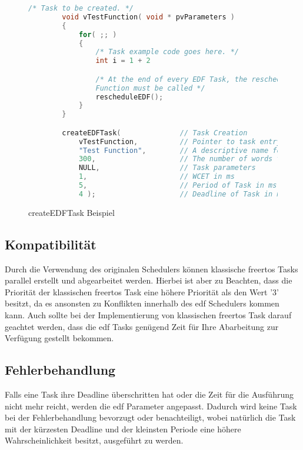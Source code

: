 \documentclass[../EDF Master Thesis.tex]{subfiles}
\begin{document}
    \begin{figure}[ht!]
        \begin{lstlisting}[language=C, caption=FreeRTOS Task creation and deletion, label=code:freertos_task_creation]
        /* Task to be created. */
        void vTestFunction( void * pvParameters )
        {
            for( ;; )
            {
                /* Task example code goes here. */
                int i = 1 + 2

                /* At the end of every EDF Task, the rescheduleED
                Function must be called */
                rescheduleEDF();
            }
        }

        createEDFTask(              // Task Creation
            vTestFunction,          // Pointer to task entry function
            "Test Function",        // A descriptive name for the task
            300,                    // The number of words to allocate
            NULL,                   // Task parameters 
            1,                      // WCET in ms
            5,                      // Period of Task in ms
            4 );                    // Deadline of Task in ms
        \end{lstlisting}
        \caption{createEDFTask Beispiel}
        \label{code:create_edf_task_example}
    \end{figure}

\subsection{Kompatibilität}

    Durch die Verwendung des originalen Schedulers können klassische \ac{freertos} Tasks parallel erstellt und abgearbeitet werden.
    Hierbei ist aber zu Beachten, dass die Priorität der klassischen \ac{freertos} Task eine höhere Priorität als den Wert '3' besitzt, da es ansonsten zu Konflikten innerhalb des \ac{edf} Schedulers kommen kann.
    Auch sollte bei der Implementierung von klassischen \ac{freertos} Task darauf geachtet werden, dass die \ac{edf} Tasks genügend Zeit für Ihre Abarbeitung zur Verfügung gestellt bekommen.


\subsection{Fehlerbehandlung} \label{section:Fehlerbehandlung}

    Falls eine Task ihre Deadline überschritten hat oder die Zeit für die Ausführung nicht mehr reicht, werden die \ac{edf} Parameter angepasst.
    Dadurch wird keine Task bei der Fehlerbehandlung bevorzugt oder benachteiligt, wobei natürlich die Task mit der kürzesten Deadline und der kleinsten Periode eine höhere Wahrscheinlichkeit besitzt, ausgeführt zu werden. 
\end{document}
